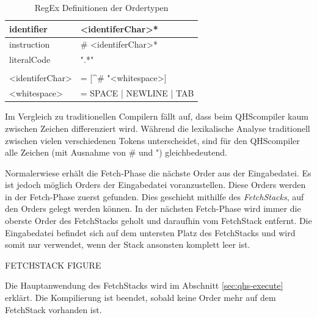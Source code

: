 \begin{table}[h]
    \centering
    \caption{RegEx Definitionen der Ordertypen}
    \vspace{3mm} %
    
    \begin{tabular}{ll}
    \multicolumn{1}{l|}{identifier}        & \textless{}identiferChar\textgreater{}*                           \\ \hline
    \multicolumn{1}{l|}{instruction}       & \# \textless{}identiferChar\textgreater{}*                        \\ \hline
    \multicolumn{1}{l|}{literalCode}       & ".*"                                                              \\
                                           &                                                                   \\
    \textless{}identiferChar\textgreater{} & = {[}\textasciicircum{}\# "\textless{}whitespace\textgreater{}{]} \\
    \textless{}whitespace\textgreater{}    & = SPACE | NEWLINE | TAB
    
    \end{tabular}
\end{table}

Im Vergleich zu traditionellen Compilern fällt auf, dass beim QHScompiler kaum zwischen Zeichen differenziert wird. Während die lexikalische Analyse traditionell zwischen vielen verschiedenen Tokens unterscheidet,
sind für den QHScompiler alle Zeichen (mit Ausnahme von \# und ") gleichbedeutend.

Normalerwiese erhält die Fetch-Phase die nächste Order aus der Eingabedatei. 
Es ist jedoch möglich Orders der Eingabedatei voranzustellen. Diese Orders werden in der Fetch-Phase zuerst gefunden. Dies geschieht mithilfe des \textit{FetchStacks}, auf den Orders gelegt werden können.
In der nächsten Fetch-Phase wird immer die oberste Order des FetchStacks geholt und daraufhin vom FetchStack entfernt.
Die Eingabedatei befindet sich auf dem untersten Platz des FetchStacks und wird somit nur verwendet, wenn der Stack ansonsten komplett leer ist.

FETCHSTACK FIGURE

%
%
Die Hauptanwendung des FetchStacks wird im Abschnitt \ref{sec:qhs-execute} erklärt.
Die Kompilierung ist beendet, sobald keine Order mehr auf dem FetchStack vorhanden ist.

